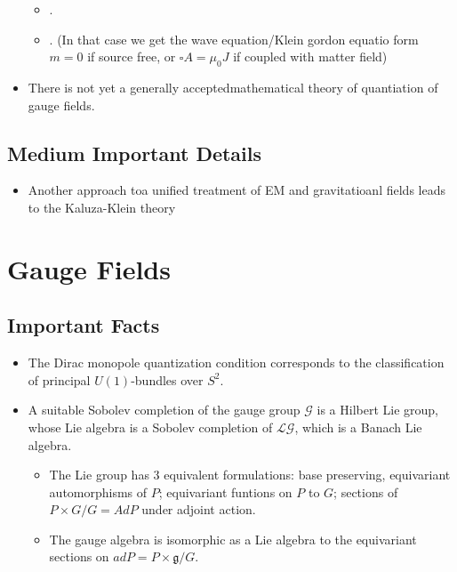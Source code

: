 \documentclass[12pt]{report}
\begin{document}
\begin{itemize}
\begin{itemize}
        \item {}.
        
        \item {}. (In that case we get the wave equation/Klein gordon equatio form $m=0$ if source free, or $\square A = \mu_0 J$ if coupled with matter field)
    \end{itemize}
    
    \item There is not yet a generally acceptedmathematical theory of quantiation of gauge fields.
\end{itemize}

\subsection{Medium Important Details}
\begin{itemize}
    \item Another approach toa  unified treatment of EM and gravitatioanl fields leads to the Kaluza-Klein theory
\end{itemize}
\section{Gauge Fields}

\subsection{Important Facts}
\begin{itemize}
    \item The Dirac monopole quantization condition corresponds to the classification of principal $U(1)$-bundles over $S^2$.
    
    \item A suitable Sobolev completion of the gauge group $\mathcal G$ is a Hilbert Lie group, whose Lie algebra is a Sobolev completion of $\mathcal{LG}$, which is a Banach Lie algebra.
    \begin{itemize}
        \item The Lie group has $3$ equivalent formulations: base preserving, equivariant automorphisms of $P$; equivariant funtions on $P$ to $G$; sections of $P \times G / G = Ad P$ under adjoint action.
        
        \item The gauge algebra is isomorphic as a Lie algebra to the equivariant sections on $ad P = P \times \mathfrak g / G$.
    \end{itemize}
\end{itemize}
\end{document}
